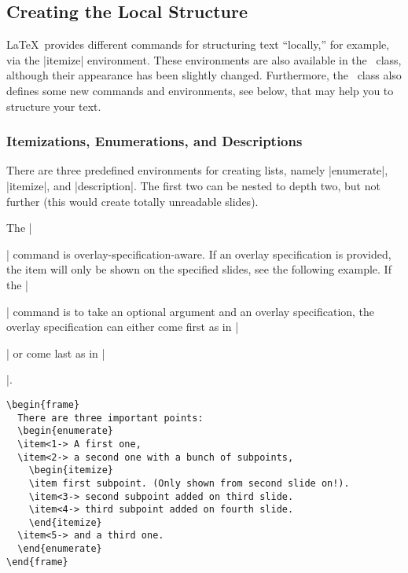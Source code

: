 \subsection{Creating the Local Structure}

\LaTeX\ provides different commands for structuring text ``locally,''
for example, via the |itemize| environment. These environments
are also available in the \beamer\ class, although their appearance has
been slightly changed. Furthermore, the \beamer\ class also defines
some new commands and environments, see below, that may help you to
structure your text.


\subsubsection{Itemizations, Enumerations, and Descriptions}

\label{section-enumerate}

There are three predefined environments for creating lists, namely
|enumerate|, |itemize|, and |description|. The first
two can be nested to depth two, but not further (this would
create totally unreadable slides).

The |\item| command is overlay-specification-aware. If an overlay
specification is provided, the item will only be shown on the
specified slides, see the following example. If the |\item|
command is to take an optional argument and an overlay specification,
the overlay specification can either come first as in |\item<1>[Cat]|
or come last as in |\item[Cat]<1>|.

\begin{verbatim}
\begin{frame}
  There are three important points:
  \begin{enumerate}
  \item<1-> A first one,
  \item<2-> a second one with a bunch of subpoints,
    \begin{itemize}
    \item first subpoint. (Only shown from second slide on!).
    \item<3-> second subpoint added on third slide.
    \item<4-> third subpoint added on fourth slide.
    \end{itemize}
  \item<5-> and a third one.
  \end{enumerate}
\end{frame}
\end{verbatim}


